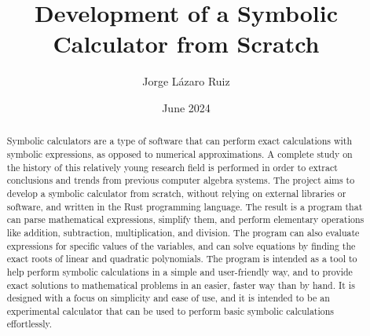 \documentclass[en]{uc3mthesisIEEE}
\title{Development of a Symbolic Calculator from Scratch}
\author{Jorge Lázaro Ruiz}
\date{June 2024}
\begin{document}
  \makecover



  \begin{abstract}
    Symbolic calculators are a type of software that can perform exact calculations with symbolic expressions, as opposed to numerical approximations. A complete study on the history of this relatively young research field is performed in order to extract conclusions and trends from previous computer algebra systems. The project aims to develop a symbolic calculator from scratch, without relying on external libraries or software, and written in the Rust programming language. The result is a program that can parse mathematical expressions, simplify them, and perform elementary operations like addition, subtraction, multiplication, and division. The program can also evaluate expressions for specific values of the variables, and can solve equations by finding the exact roots of linear and quadratic polynomials. The program is intended as a tool to help perform symbolic calculations in a simple and user-friendly way, and to provide exact solutions to mathematical problems in an easier, faster way than by hand. It is designed with a focus on simplicity and ease of use, and it is intended to be an experimental calculator that can be used to perform basic symbolic calculations effortlessly.
  \end{abstract}
\end{document}
